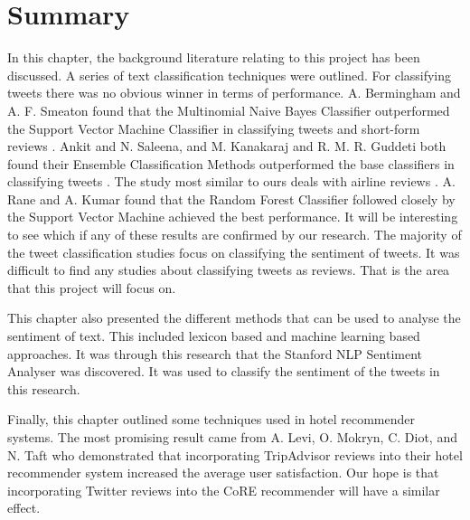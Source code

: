 \section{Summary}


In this chapter, the background literature relating to this project has been discussed. A series of text classification techniques were outlined. For classifying tweets there was no obvious winner in terms of performance. A. Bermingham and A. F. Smeaton found that the Multinomial Naive Bayes Classifier outperformed the Support Vector Machine Classifier in classifying tweets and short-form reviews \cite{Berm2010}. Ankit and N. Saleena, and M. Kanakaraj and R. M. R. Guddeti both found their Ensemble Classification Methods outperformed the base classifiers in classifying tweets \cite{Ankit2018,Kanakaraj2015}. The study most similar to ours deals with airline reviews \cite{Rane2018}. A. Rane and A. Kumar found that the Random Forest Classifier followed closely by the Support Vector Machine achieved the best performance. It will be interesting to see which if any of these results are confirmed by our research. The majority of the tweet classification studies focus on classifying the sentiment of tweets. It was difficult to find any studies about classifying tweets as reviews. That is the area that this project will focus on. 

This chapter also presented the different methods that can be used to analyse the sentiment of text. This included lexicon based and machine learning based approaches. It was through this research that the Stanford NLP Sentiment Analyser \cite{stanfordSentiment2013} was discovered. It was used to classify the sentiment of the tweets in this research.

Finally, this chapter outlined some techniques used in hotel recommender systems. The most promising result came from A. Levi, O. Mokryn, C. Diot, and N. Taft who demonstrated that incorporating TripAdvisor reviews into their hotel recommender system increased the average user satisfaction. Our hope is that incorporating Twitter reviews into the CoRE recommender will have a similar effect.